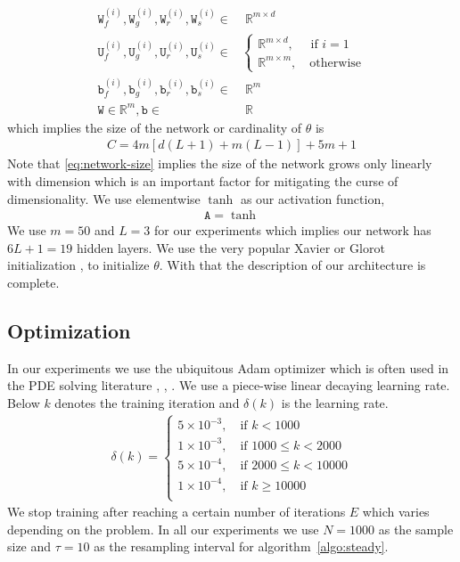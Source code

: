 \begin{align}
   \mathtt W_f^{(i)}, 
   \mathtt W_g^{(i)},  \mathtt W_r^{(i)},  \mathtt W_s^{(i)} \in&\;
   \mathbb R^{m\times d}\\
   \mathtt U_f^{(i)},
\mathtt U_g^{(i)},
\mathtt U_r^{(i)},
\mathtt U_s^{(i)}\in&
   \begin{cases}\mathbb R^{m\times d},\quad\text{ if }i=1 \\
   \mathbb R^{m\times m},\quad\text{otherwise}
   \end{cases}\\
   \mathtt b_f^{(i)},\mathtt b_g^{(i)},\mathtt b_r^{(i)},\mathtt b_s^{(i)}\in&\;\mathbb R^m\\
   \mathtt W\in\mathbb R^{m}, \mathtt b\in&\;\mathbb R
\end{align}
which implies the size of the network or cardinality of $\theta$ is
\begin{align}
    C=4m[d(L+1)+m(L-1)]+5m+1\label{eq:network-size}
\end{align}
Note that \eqref{eq:network-size} implies the size of the network grows only linearly with dimension which is an important factor for mitigating the curse of dimensionality. We use elementwise $\tanh$ as our activation function,
\begin{align}
    \mathtt A=\tanh\label{eq:activation-choice}
\end{align}
We use $m=50$ and $L=3$ for our experiments which implies our network has $6L+1=19$ hidden layers. We use the very popular Xavier or Glorot initialization \cite{glorot2010understanding}, \cite{datta2020survey} to initialize $\theta$. With that the description of our architecture is complete. 

\subsection{Optimization}\label{ssec-optimization}
In our experiments we use the ubiquitous Adam optimizer \cite{kingma2014adam} which is often used in the PDE solving literature \cite{han2018solving}, \cite{zhai2022deep}, \cite{sirignano2018dgm}. We use a piece-wise linear decaying learning rate. Below $k$ denotes the training iteration and $\delta(k)$ is the learning rate.
\begin{align}
    \delta(k)=\begin{cases}
        5\times10^{-3},\quad\text{if } k<1000
        \\
        1\times10^{-3},\quad\text{if }1000\le k<2000\\
        5\times10^{-4},\quad\text{if }2000\le k<10000\\
        1\times10^{-4},\quad\text{if }k\ge10000\\
        \end{cases}\label{eq:learning-rate}
\end{align}
We stop training after reaching a certain number of iterations $E$ which varies depending on the problem. In all our experiments we use $N=1000$ as the sample size and $\tau=10$ as the resampling interval for algorithm~\ref{algo:steady}.

